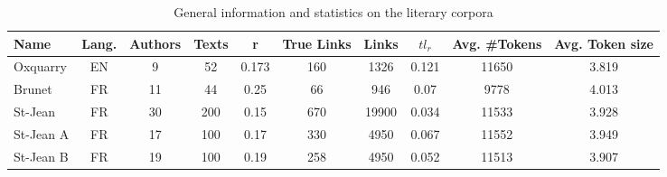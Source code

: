 \begin{table*}
  \centering
  \caption{General information and statistics on the literary corpora}
  \label{tab:lit_corpora}
  \begin{tabular}{l c c c c c c c c c}
    \toprule
    \textbf{Name} &
    \textbf{Lang.} &
    \textbf{Authors} &
    \textbf{Texts} &
    \textbf{r} &
    \textbf{True Links} &
    \textbf{Links} &
    \textbf{$tl_r$} &
    \textbf{Avg. \#Tokens} &
    \textbf{Avg. Token size} \\
    \midrule
    Oxquarry & EN & 9 & 52 & 0.173 & 160 & 1326 & 0.121 & 11650 & 3.819 \\
    Brunet & FR & 11 & 44 & 0.25 & 66 & 946 & 0.07 & 9778 & 4.013 \\
    St-Jean & FR & 30 & 200 & 0.15 & 670 & 19900 & 0.034 & 11533 & 3.928 \\
    St-Jean A & FR & 17 & 100 & 0.17 & 330 & 4950 & 0.067 & 11552 & 3.949 \\
    St-Jean B & FR & 19 & 100 & 0.19 & 258 & 4950 & 0.052 & 11513 & 3.907 \\
    \bottomrule
  \end{tabular}
\end{table*}
